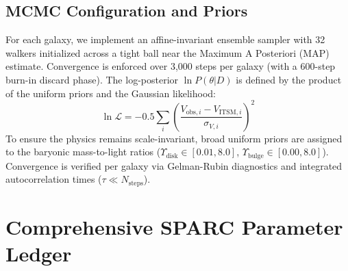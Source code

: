 \documentclass[aps,prd,10pt,onecolumn,superscriptaddress,nofootinbib]{revtex4-2}
\begin{document}
\subsection{MCMC Configuration and Priors}
For each galaxy, we implement an affine-invariant ensemble sampler with 32 walkers initialized across a tight ball near the Maximum A Posteriori (MAP) estimate. Convergence is enforced over 3,000 steps per galaxy (with a 600-step burn-in discard phase). The log-posterior $\ln P(\theta | D)$ is defined by the product of the uniform priors and the Gaussian likelihood:
\begin{equation}
    \ln \mathcal{L} = -0.5 \sum_i \left( \frac{V_{\text{obs},i} - V_{\text{ITSM},i}}{\sigma_{V,i}} \right)^2
\end{equation}
To ensure the physics remains scale-invariant, broad uniform priors are assigned to the baryonic mass-to-light ratios ($\Upsilon_{\text{disk}} \in [0.01, 8.0]$, $\Upsilon_{\text{bulge}} \in [0.00, 8.0]$). Convergence is verified per galaxy via Gelman-Rubin diagnostics and integrated autocorrelation times ($\tau \ll N_{\text{steps}}$).

\section{Comprehensive SPARC Parameter Ledger}




\end{document}
